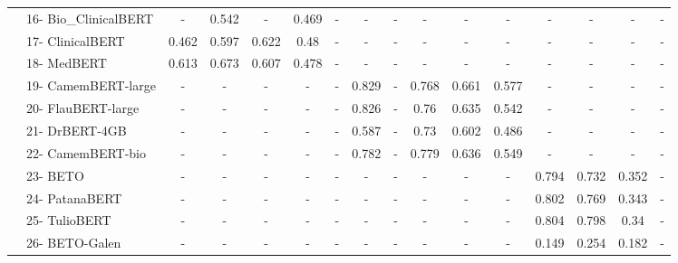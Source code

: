{\begin{tabular}{ll|ccccc|ccccc|cccc}
 & 16- Bio_ClinicalBERT & - & 0.542 & - & 0.469 & - & - & - & - & - & - & - & - & - & - \\
 & 17- ClinicalBERT & 0.462 & 0.597 & 0.622 & 0.48 & - & - & - & - & - & - & - & - & - & - \\
 & 18- MedBERT & 0.613 & 0.673 & 0.607 & 0.478 & - & - & - & - & - & - & - & - & - & - \\
 & 19- CamemBERT-large & - & - & - & - & - & 0.829 & - & 0.768 & 0.661 & 0.577 & - & - & - & - \\
 & 20- FlauBERT-large & - & - & - & - & - & 0.826 & - & 0.76 & 0.635 & 0.542 & - & - & - & - \\
 & 21- DrBERT-4GB & - & - & - & - & - & 0.587 & - & 0.73 & 0.602 & 0.486 & - & - & - & - \\
 & 22- CamemBERT-bio & - & - & - & - & - & 0.782 & - & 0.779 & 0.636 & 0.549 & - & - & - & - \\
 & 23- BETO & - & - & - & - & - & - & - & - & - & - & 0.794 & 0.732 & 0.352 & - \\
 & 24- PatanaBERT & - & - & - & - & - & - & - & - & - & - & 0.802 & 0.769 & 0.343 & - \\
 & 25- TulioBERT & - & - & - & - & - & - & - & - & - & - & 0.804 & 0.798 & 0.34 & - \\
 & 26- BETO-Galen & - & - & - & - & - & - & - & - & - & - & 0.149 & 0.254 & 0.182 & - \\
\bottomrule
\end{tabular}}